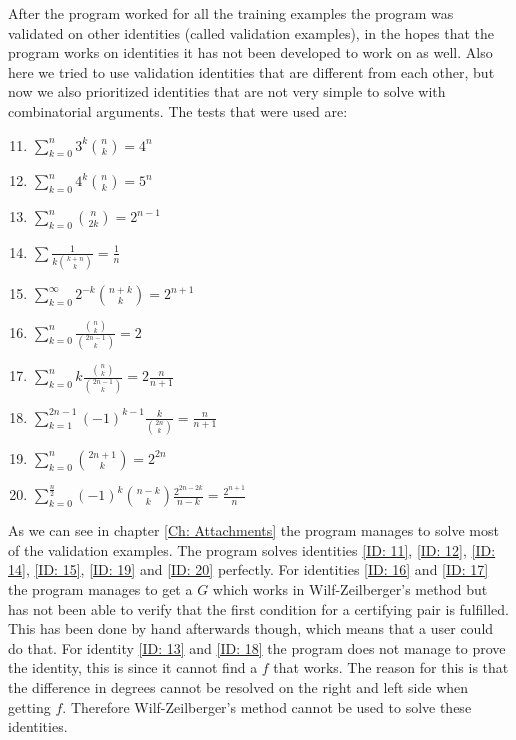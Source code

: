 After the program worked for all the training examples the program was validated on other identities (called validation examples), in the hopes that the program works on identities it has not been developed to work on as well. Also here we tried to use validation identities that are different from each other, but now we also prioritized identities that are not very simple to solve with combinatorial arguments. The tests that were used are:
\begin{enumerate}
  \setcounter{enumi}{10}
  \item $\sum_{k=0}^n 3^k\binom{n}{k} = 4^n$ \label{ID: 11}
  \item $\sum_{k=0}^n 4^k\binom{n}{k} = 5^n$ \label{ID: 12}
  \item $\sum_{k=0}^n \binom{n}{2k} = 2^{n-1}$ \label{ID: 13}
  \item $\sum \frac{1}{k\binom{k+n}{k}} = \frac{1}{n}$ \label{ID: 14}
  \item $\sum_{k=0}^\infty 2^{-k}\binom{n+k}{k} = 2^{n+1}$ \label{ID: 15}
  \item $\sum_{k=0}^n \frac{\binom{n}{k}}{\binom{2n-1}{k}} = 2$ \label{ID: 16}
  \item $\sum_{k=0}^n k\frac{\binom{n}{k}}{\binom{2n-1}{k}} = 2\frac{n}{n+1}$ \label{ID: 17}
  \item $\sum_{k=1}^{2n-1} (-1)^{k-1}\frac{k}{\binom{2n}{k}} = \frac{n}{n+1}$ \label{ID: 18}
  \item $\sum_{k=0}^n \binom{2n+1}{k} = 2^{2n}$ \label{ID: 19}
  \item $\sum_{k=0}^{\frac{n}{2}} (-1)^k\binom{n-k}{k}\frac{2^{2n-2k}}{n-k} = \frac{2^{n+1}}{n}$ \label{ID: 20}
\end{enumerate}
As we can see in chapter \ref{Ch: Attachments} the program manages to solve most of the validation examples. The program solves identities \ref{ID: 11}, \ref{ID: 12}, \ref{ID: 14}, \ref{ID: 15}, \ref{ID: 19} and \ref{ID: 20} perfectly. For identities \ref{ID: 16} and \ref{ID: 17} the program manages to get a $G$ which works in Wilf-Zeilberger's method but has not been able to verify that the first condition for a certifying pair is fulfilled. This has been done by hand afterwards though, which means that a user could do that. For identity \ref{ID: 13} and \ref{ID: 18} the program does not manage to prove the identity, this is since it cannot find a $f$ that works. The reason for this is that the difference in degrees cannot be resolved on the right and left side when getting $f$. Therefore Wilf-Zeilberger's method cannot be used to solve these identities.
